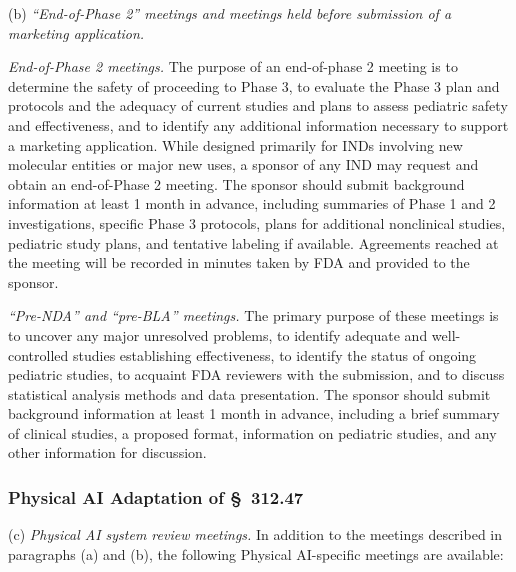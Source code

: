 (b) \textit{``End-of-Phase 2'' meetings and meetings held before submission of a marketing application.}

\begin{description}[leftmargin=0.5cm,style=sameline]
\item[(1)] \textit{End-of-Phase 2 meetings.} The purpose of an end-of-phase 2 meeting is to determine the safety of proceeding to Phase 3, to evaluate the Phase 3 plan and protocols and the adequacy of current studies and plans to assess pediatric safety and effectiveness, and to identify any additional information necessary to support a marketing application. While designed primarily for INDs involving new molecular entities or major new uses, a sponsor of any IND may request and obtain an end-of-Phase 2 meeting. The sponsor should submit background information at least 1 month in advance, including summaries of Phase 1 and 2 investigations, specific Phase 3 protocols, plans for additional nonclinical studies, pediatric study plans, and tentative labeling if available. Agreements reached at the meeting will be recorded in minutes taken by FDA and provided to the sponsor.

\item[(2)] \textit{``Pre-NDA'' and ``pre-BLA'' meetings.} The primary purpose of these meetings is to uncover any major unresolved problems, to identify adequate and well-controlled studies establishing effectiveness, to identify the status of ongoing pediatric studies, to acquaint FDA reviewers with the submission, and to discuss statistical analysis methods and data presentation. The sponsor should submit background information at least 1 month in advance, including a brief summary of clinical studies, a proposed format, information on pediatric studies, and any other information for discussion.
\end{description}

\subsubsection{Physical AI Adaptation of \S~312.47}

(c) \textit{Physical AI system review meetings.} In addition to the meetings described in paragraphs (a) and (b), the following Physical AI-specific meetings are available:

